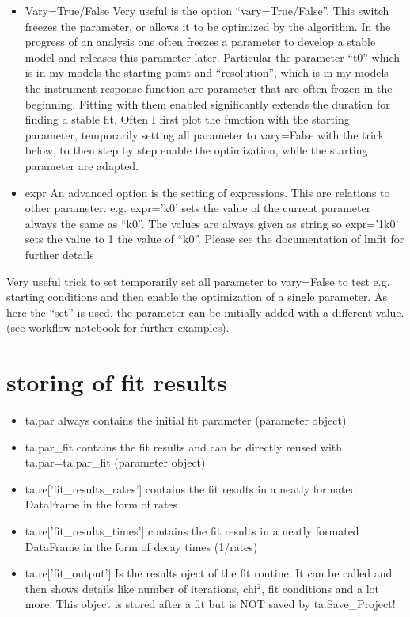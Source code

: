 \documentclass[letterpaper,10pt,english]{sphinxmanual}
\begin{document}
\begin{itemize}
\item {} 
Vary=True/False
Very useful is the option “vary=True/False”. This switch freezes the
parameter, or allows it to be optimized by the algorithm. In the
progress of an analysis one often freezes a parameter to develop a
stable model and releases this parameter later. Particular the
parameter “t0” which is in my models the starting point and
“resolution”, which is in my models the instrument response function
are parameter that are often frozen in the beginning. Fitting with
them enabled significantly extends the duration for finding a stable
fit. Often I first plot the function with the starting parameter,
temporarily setting all parameter to vary=False with the trick below,
to then step by step enable the optimization, while the starting
parameter are adapted.

\item {} 
expr
An advanced option is the setting of expressions. This are relations
to other parameter. e.g. expr=’k0’ sets the value of the current
parameter always the same as “k0”. The values are always given as
string so expr=’1\sphinxhyphen{}k0’ sets the value to 1 \sphinxhyphen{} the value of “k0”. Please
see the documentation of lmfit for further details

\end{itemize}

Very useful trick to set temporarily set all parameter to vary=False to
test e.g. starting conditions and then enable the optimization of a
single parameter. As here the “set” is used, the parameter can be
initially added with a different value. (see workflow notebook for
further examples).


\section{storing of fit results}
\label{\detokenize{Fitting:storing-of-fit-results}}\begin{itemize}
\item {} 
ta.par
always contains the initial fit parameter (parameter object)

\item {} 
ta.par\_fit
contains the fit results and can be directly re\sphinxhyphen{}used with
ta.par=ta.par\_fit (parameter object)

\item {} 
ta.re{[}’fit\_results\_rates’{]}
contains the fit results in a neatly formated DataFrame in the form
of rates

\item {} 
ta.re{[}’fit\_results\_times’{]}
contains the fit results in a neatly formated DataFrame in the form
of decay times (1/rates)

\item {} 
ta.re{[}’fit\_output’{]}
Is the results oject of the fit routine. It can be called and then
shows details like number of iterations, chi\(^2\), fit
conditions and a lot more. This object is stored after a fit but is
NOT saved by ta.Save\_Project!

\end{itemize}
\end{document}
